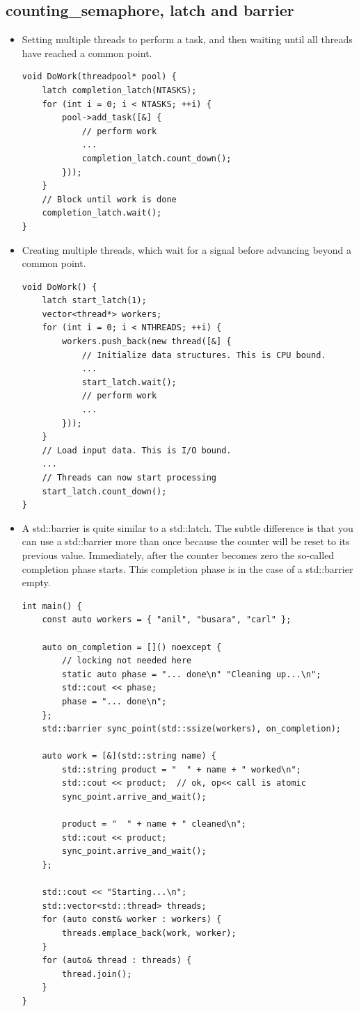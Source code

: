 \documentclass[a4paper,11pt,twoside]{book}
\begin{document}
\subsection{counting\_semaphore, latch and barrier}
\begin{itemize}
	\item Setting multiple threads to perform a task, and then waiting until all threads have reached a common point.
	
\begin{lstlisting}[numbers=none]
void DoWork(threadpool* pool) {
	latch completion_latch(NTASKS);
	for (int i = 0; i < NTASKS; ++i) {
		pool->add_task([&] {
			// perform work
			...
			completion_latch.count_down();
		}));
	}
	// Block until work is done
	completion_latch.wait();
}
\end{lstlisting}	

	\item Creating multiple threads, which wait for a signal before advancing beyond a common point.
\begin{lstlisting}[numbers=none]
void DoWork() {
	latch start_latch(1);
	vector<thread*> workers;
	for (int i = 0; i < NTHREADS; ++i) {
		workers.push_back(new thread([&] {
			// Initialize data structures. This is CPU bound.
			...
			start_latch.wait();
			// perform work
			...
		}));
	}
	// Load input data. This is I/O bound.
	...
	// Threads can now start processing
	start_latch.count_down();
}
\end{lstlisting}

\item A std::barrier is quite similar to a std::latch. The subtle difference is that you can use a  std::barrier more than once because the counter will be reset to its previous value. Immediately, after the counter becomes zero the so-called completion phase starts. This completion phase is in the case of a std::barrier empty. 

\begin{lstlisting}[numbers=none]
int main() {
	const auto workers = { "anil", "busara", "carl" };
	
	auto on_completion = []() noexcept { 
		// locking not needed here
		static auto phase = "... done\n" "Cleaning up...\n";
		std::cout << phase;
		phase = "... done\n";
	};
	std::barrier sync_point(std::ssize(workers), on_completion);
	
	auto work = [&](std::string name) {
		std::string product = "  " + name + " worked\n";
		std::cout << product;  // ok, op<< call is atomic
		sync_point.arrive_and_wait();
		
		product = "  " + name + " cleaned\n";
		std::cout << product;
		sync_point.arrive_and_wait();
	};
	
	std::cout << "Starting...\n";
	std::vector<std::thread> threads;
	for (auto const& worker : workers) {
		threads.emplace_back(work, worker);
	}
	for (auto& thread : threads) {
		thread.join();
	}
}
\end{lstlisting}


\end{itemize}
\end{document}
